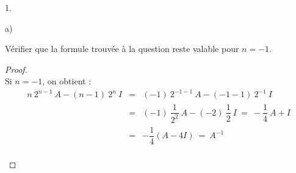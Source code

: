 \documentclass[11pt]{article}%
\begin{document}
\begin{noliste}{1.}
\begin{noliste}{a)}
  \item Vérifier que la formule trouvée à la question  reste
    valable pour $n = -1$.

    \begin{proof}~\\
      Si $n=-1$, on obtient :
      \[
      \begin{array}{rcl}
        n \ 2^{n-1} \ A - (n-1) \ 2^n \ I & = & (-1)\ 2^{-1-1}\ A - (-1-1)\
        2^{-1}\ I 
        \\[.2cm]
        & = & (-1) \ \dfrac{1}{2^2} \ A - (-2) \ \dfrac{1}{2} \ I \ = \ 
        -\dfrac{1}{4} \ A + I 
        \\[.2cm]
        & = & -\dfrac{1}{4} (A - 4I) \ = \ A^{-1}
      \end{array}
      \]
      ~\\[-1.2cm]
    \end{proof}
  \end{noliste}
\end{noliste}


\newpage
\end{document}
